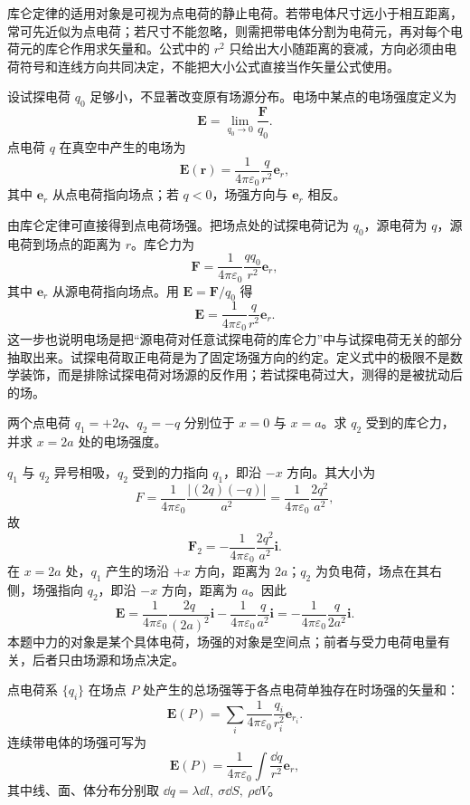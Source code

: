 库仑定律的适用对象是可视为点电荷的静止电荷。若带电体尺寸远小于相互距离，常可先近似为点电荷；若尺寸不能忽略，则需把带电体分割为电荷元，再对每个电荷元的库仑作用求矢量和。公式中的 $r^2$ 只给出大小随距离的衰减，方向必须由电荷符号和连线方向共同决定，不能把大小公式直接当作矢量公式使用。

\begin{definition}[电场强度]\label{def:electric-field}
设试探电荷 $q_0$ 足够小，不显著改变原有场源分布。电场中某点的电场强度定义为
\[
  \bm E=\lim_{q_0\to 0}\frac{\bm F}{q_0}.
\]
点电荷 $q$ 在真空中产生的电场为
\[
  \bm E(\bm r)=\frac{1}{4\pi\varepsilon_0}\frac{q}{r^2}\bm e_r,
\]
其中 $\bm e_r$ 从点电荷指向场点；若 $q<0$，场强方向与 $\bm e_r$ 相反。
\end{definition}

由库仑定律可直接得到点电荷场强。把场点处的试探电荷记为 $q_0$，源电荷为 $q$，源电荷到场点的距离为 $r$。库仑力为
\[
  \bm F=\frac{1}{4\pi\varepsilon_0}\frac{qq_0}{r^2}\bm e_r,
\]
其中 $\bm e_r$ 从源电荷指向场点。用 $\bm E=\bm F/q_0$ 得
\[
  \bm E=\frac{1}{4\pi\varepsilon_0}\frac{q}{r^2}\bm e_r.
\]
这一步也说明电场是把“源电荷对任意试探电荷的库仑力”中与试探电荷无关的部分抽取出来。试探电荷取正电荷是为了固定场强方向的约定。定义式中的极限不是数学装饰，而是排除试探电荷对场源的反作用；若试探电荷过大，测得的是被扰动后的场。

\begin{example}[title={两点电荷的库仑力与场强}]\label{eg:two-charge-coulomb}
两个点电荷 $q_1=+2q$、$q_2=-q$ 分别位于 $x=0$ 与 $x=a$。求 $q_2$ 受到的库仑力，并求 $x=2a$ 处的电场强度。
\begin{solution}
$q_1$ 与 $q_2$ 异号相吸，$q_2$ 受到的力指向 $q_1$，即沿 $-x$ 方向。其大小为
\[
  F=\frac{1}{4\pi\varepsilon_0}\frac{|(2q)(-q)|}{a^2}
  =\frac{1}{4\pi\varepsilon_0}\frac{2q^2}{a^2},
\]
故
\[
  \bm F_2=-\frac{1}{4\pi\varepsilon_0}\frac{2q^2}{a^2}\bm i.
\]
在 $x=2a$ 处，$q_1$ 产生的场沿 $+x$ 方向，距离为 $2a$；$q_2$ 为负电荷，场点在其右侧，场强指向 $q_2$，即沿 $-x$ 方向，距离为 $a$。因此
\[
  \bm E=\frac{1}{4\pi\varepsilon_0}\frac{2q}{(2a)^2}\bm i
  -\frac{1}{4\pi\varepsilon_0}\frac{q}{a^2}\bm i
  =-\frac{1}{4\pi\varepsilon_0}\frac{q}{2a^2}\bm i.
\]
本题中力的对象是某个具体电荷，场强的对象是空间点；前者与受力电荷电量有关，后者只由场源和场点决定。
\end{solution}
\end{example}

\begin{theorem}[叠加原理]\label{thm:superposition}
点电荷系 $\{q_i\}$ 在场点 $P$ 处产生的总场强等于各点电荷单独存在时场强的矢量和：
\[
  \bm E(P)=\sum_i \frac{1}{4\pi\varepsilon_0}\frac{q_i}{r_i^2}\bm e_{r_i}.
\]
连续带电体的场强可写为
\[
  \bm E(P)=\frac{1}{4\pi\varepsilon_0}\int \frac{\dd q}{r^2}\bm e_r,
\]
其中线、面、体分布分别取 $\dd q=\lambda\dd l,\ \sigma\dd S,\ \rho\dd V$。
\end{theorem}

